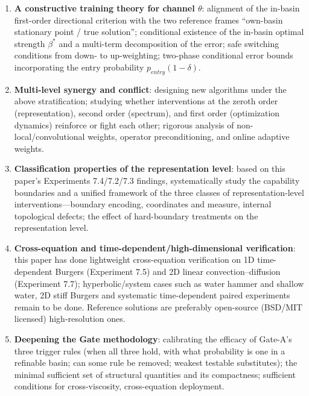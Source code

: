 \documentclass[11pt]{article}
\numberwithin{equation}{section}
\begin{document}
\begin{enumerate}[label=(\arabic*),leftmargin=2em,itemsep=1pt]
\item \textbf{A constructive training theory for channel $\theta$}: alignment of the in-basin first-order directional criterion with the two reference frames ``own-basin stationary point / true solution''; conditional existence of the in-basin optimal strength $\beta^*$ and a multi-term decomposition of the error; safe switching conditions from down- to up-weighting; two-phase conditional error bounds incorporating the entry probability $p_{entry}(1-\delta)$.
\item \textbf{Multi-level synergy and conflict}: designing new algorithms under the above stratification; studying whether interventions at the zeroth order (representation), second order (spectrum), and first order (optimization dynamics) reinforce or fight each other; rigorous analysis of non-local/convolutional weights, operator preconditioning, and online adaptive weights.
\item \textbf{Classification properties of the representation level}: based on this paper's Experiments 7.4/7.2/7.3 findings, systematically study the capability boundaries and a unified framework of the three classes of representation-level interventions---boundary encoding, coordinates and measure, internal topological defects; the effect of hard-boundary treatments on the representation level.
\item \textbf{Cross-equation and time-dependent/high-dimensional verification}: this paper has done lightweight cross-equation verification on 1D time-dependent Burgers (Experiment 7.5) and 2D linear convection--diffusion (Experiment 7.7); hyperbolic/system cases such as water hammer and shallow water, 2D stiff Burgers and systematic time-dependent paired experiments remain to be done. Reference solutions are preferably open-source (BSD/MIT licensed) high-resolution ones.
\item \textbf{Deepening the Gate methodology}: calibrating the efficacy of Gate-A's three trigger rules (when all three hold, with what probability is one in a refinable basin; can some rule be removed; weakest testable substitutes); the minimal sufficient set of structural quantities and its compactness; sufficient conditions for cross-viscosity, cross-equation deployment.
\end{enumerate}
\end{document}
